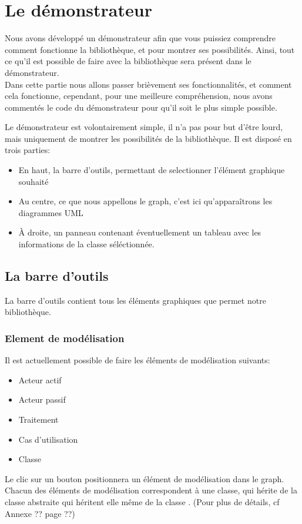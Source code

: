 \documentclass[12pt,a4paper,openany]{report}
\begin{document}
	\chapter{Le démonstrateur}
	Nous avons développé un démonstrateur afin que vous puissiez comprendre comment fonctionne la bibliothèque, et pour montrer ses possibilités.
	Ainsi, tout ce qu'il est possible de faire avec la bibliothèque sera présent dans le démonstrateur.\\
	Dans cette partie nous allons passer brièvement ses fonctionnalités, et comment cela fonctionne, cependant, pour une meilleure
	compréhension, nous avons commentés le code du démonstrateur pour qu'il soit le plus simple possible. 
	
	Le démonstrateur est volontairement simple, il n'a pas pour but d'être lourd, mais uniquement de montrer les possibilités de la bibliothèque. 
	Il est disposé en trois parties:
	\begin{itemize}
		\item En haut, la barre d'outils, permettant de selectionner l'élément graphique souhaité
		\item Au centre, ce que nous appellons le graph, c'est ici qu'apparaîtrons les diagrammes UML
		\item À droite, un panneau contenant éventuellement un tableau avec les informations de la classe séléctionnée.
	\end{itemize}
	\section{La barre d'outils}
	La barre d'outils contient tous les éléments graphiques que permet notre bibliothèque.
	\subsection{Element de modélisation}
	Il est actuellement possible de faire les éléments de modélisation suivants:
	\begin{itemize}
		\item Acteur actif
		\item Acteur passif
		\item Traitement
		\item Cas d'utilisation
		\item Classe
	\end{itemize}
	Le clic sur un bouton positionnera un élément de modélisation dans le graph.
	Chacun des éléments de modélisation correspondent à une classe,  qui hérite de la classe abstraite  qui héritent
	elle même de la classe . (Pour plus de détails, cf Annexe ?? page ??)%
\end{document}
